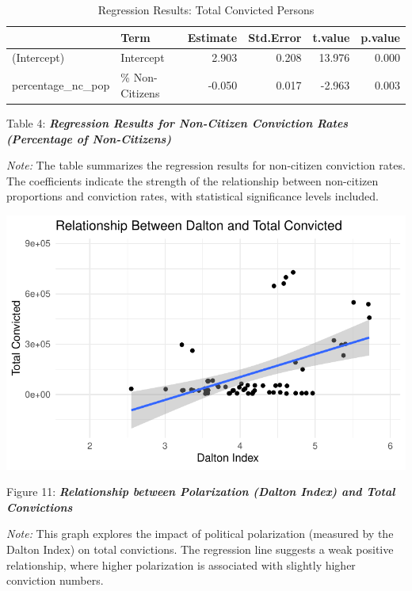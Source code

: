 \documentclass[
]{article}
\begin{document}
\begin{table}
\centering
\caption{Regression Results: Total Convicted Persons}
\centering
\begin{tabular}[t]{l|l|r|r|r|r}
\hline
  & Term & Estimate & Std.Error & t.value & p.value\\
\hline
(Intercept) & Intercept & 2.903 & 0.208 & 13.976 & 0.000\\
\hline
percentage\_nc\_pop & \% Non-Citizens & -0.050 & 0.017 & -2.963 & 0.003\\
\hline
\end{tabular}
\end{table}

Table 4: \textbf{\emph{Regression Results for Non-Citizen Conviction
Rates (Percentage of Non-Citizens)}}

\emph{Note:} The table summarizes the regression results for non-citizen
conviction rates. The coefficients indicate the strength of the
relationship between non-citizen proportions and conviction rates, with
statistical significance levels included.

\includegraphics{DataMan_Project_files/figure-pdf/unnamed-chunk-40-1.pdf}

Figure 11: \textbf{\emph{Relationship between Polarization (Dalton
Index) and Total Convictions}}

\emph{Note:} This graph explores the impact of political polarization
(measured by the Dalton Index) on total convictions. The regression line
suggests a weak positive relationship, where higher polarization is
associated with slightly higher conviction numbers.
\end{document}
